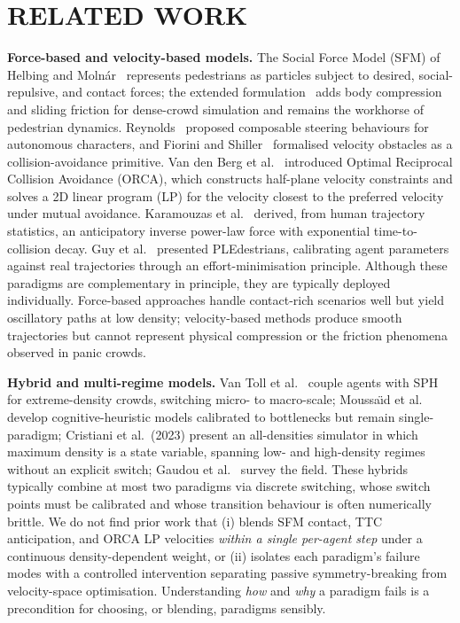 \documentclass[a4paper,twoside]{article}
\begin{document}
\section{\uppercase{Related Work}}
\label{sec:related}

\textbf{Force-based and velocity-based models.}
The Social Force Model (SFM) of Helbing and Moln\'{a}r~\cite{Helbing95} represents pedestrians as particles subject to desired, social-repulsive, and contact forces; the extended formulation~\cite{Helbing00} adds body compression and sliding friction for dense-crowd simulation and remains the workhorse of pedestrian dynamics. Reynolds~\cite{Reynolds99} proposed composable steering behaviours for autonomous characters, and Fiorini and Shiller~\cite{Fiorini98} formalised velocity obstacles as a collision-avoidance primitive. Van den Berg et al.~\cite{VandenBerg11} introduced Optimal Reciprocal Collision Avoidance (ORCA), which constructs half-plane velocity constraints and solves a 2D linear program (LP) for the velocity closest to the preferred velocity under mutual avoidance. Karamouzas et al.~\cite{Karamouzas14} derived, from human trajectory statistics, an anticipatory inverse power-law force with exponential time-to-collision decay. Guy et al.~\cite{Guy10} presented PLEdestrians, calibrating agent parameters against real trajectories through an effort-minimisation principle. Although these paradigms are complementary in principle, they are typically deployed individually. Force-based approaches handle contact-rich scenarios well but yield oscillatory paths at low density; velocity-based methods produce smooth trajectories but cannot represent physical compression or the friction phenomena observed in panic crowds.

\textbf{Hybrid and multi-regime models.}
Van Toll et al.~\cite{VanToll21} couple agents with SPH for extreme-density crowds, switching micro- to macro-scale; Moussa\"{\i}d et al.~\cite{Moussaid11} develop cognitive-heuristic models calibrated to bottlenecks but remain single-paradigm; Cristiani et al.\ (2023) present an all-densities simulator in which maximum density is a state variable, spanning low- and high-density regimes without an explicit switch; Gaudou et al.~\cite{Gaudou24} survey the field. These hybrids typically combine at most two paradigms via discrete switching, whose switch points must be calibrated and whose transition behaviour is often numerically brittle. We do not find prior work that (i) blends SFM contact, TTC anticipation, and ORCA LP velocities \emph{within a single per-agent step} under a continuous density-dependent weight, or (ii) isolates each paradigm's failure modes with a controlled intervention separating passive symmetry-breaking from velocity-space optimisation. Understanding \emph{how} and \emph{why} a paradigm fails is a precondition for choosing, or blending, paradigms sensibly.
\end{document}
